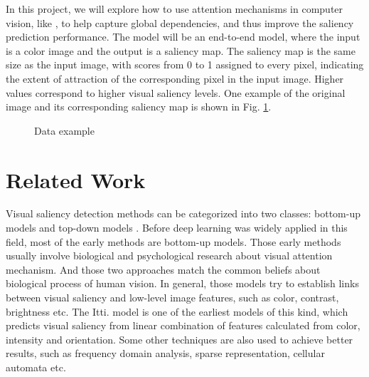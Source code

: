 \documentclass[12pt]{article}
\begin{document}
In this project, we will explore how to use attention mechanisms in computer vision, like \cite{zhangSelfAttentionGenerativeAdversarial2019a},
to help capture global dependencies, and thus improve the saliency prediction performance. 
The model will be an end-to-end model, where the input is a color image and the output is a saliency map.
The saliency map is the same size as the input image, with scores from 0 to 1 assigned to 
every pixel, indicating the extent of attraction of the corresponding pixel in the input image.
Higher values correspond to higher visual saliency levels.
One example of the original image and its corresponding saliency map is shown in Fig. \ref{img:data_example}.
\begin{figure}[!h]
    \centering
    \hspace{5mm}
    \caption{Data example}
    \label{img:data_example}
\end{figure}


\section{Related Work}

Visual saliency detection methods can be categorized into two classes: bottom-up models and top-down models \cite{congReviewVisualSaliency2019}.
Before deep learning was widely applied in this field, most of the early methods are bottom-up models.
Those early methods usually involve biological and psychological research about visual attention mechanism. And those two approaches match the common beliefs about biological process of human vision.
In general, those models try to establish links between visual saliency and low-level image features, such as color, contrast, brightness etc. The Itti. model\cite{ittiModelSaliencybasedVisual1998}
is one of the earliest models of this kind, which predicts visual saliency from linear combination of features calculated from color, intensity and orientation.
Some other techniques are also used to achieve better results, such as frequency domain analysis, sparse representation, cellular automata etc. \cite{congReviewVisualSaliency2019}
\end{document}

